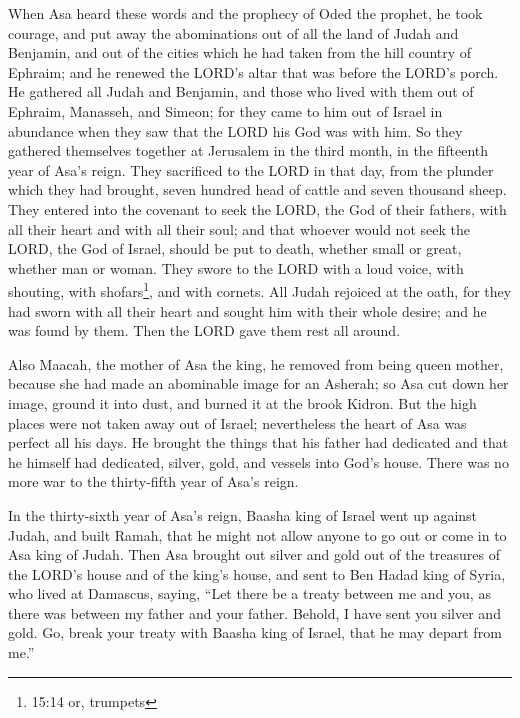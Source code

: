 \myverse{}When Asa heard these words and the prophecy of Oded the prophet,
he took courage, and put away the abominations out of all the land of Judah and Benjamin, and out of the
cities which he had taken from the hill country of Ephraim; and he renewed the LORD’s altar that was before
the LORD’s porch.
\myverse{}He gathered all Judah and Benjamin, and those who lived with them out of Ephraim,
Manasseh, and Simeon; for they came to him out of Israel in abundance when they saw that the LORD his
God was with him.
\myverse{}So they gathered themselves together at Jerusalem in the third month, in
the fifteenth year of Asa’s reign.
\myverse{}They sacrificed to the LORD in that day, from the plunder which they had
brought, seven hundred head of cattle and seven thousand sheep.
\myverse{}They entered into the covenant to seek the LORD, the God of their fathers,
with all their heart and with all their soul;
\myverse{}and that whoever would not seek the LORD, the God of Israel, should be put
to death, whether small or great, whether man or woman.
\myverse{}They swore to the LORD with a loud voice, with shouting, with shofars\footnote{15:14 or, trumpets},
and with cornets.
\myverse{}All Judah rejoiced at the oath, for they had sworn with all their heart and
sought him with their whole desire; and he was found by them. Then the LORD gave them rest all around.

\myverse{}Also Maacah, the mother of Asa the king, he removed from being
queen mother, because she had made an abominable image for an Asherah; so Asa cut down her image, ground
it into dust, and burned it at the brook Kidron.
\myverse{}But the high places were not taken away out of Israel; nevertheless the heart
of Asa was perfect all his days.
\myverse{}He brought the things that his father had dedicated and that he himself had
dedicated, silver, gold, and vessels into God’s house.
\myverse{}There was no more war to the thirty-fifth year of Asa’s reign.


\mychapter{} \myverse*{}In the thirty-sixth year of Asa’s reign, Baasha king of Israel
went up against Judah, and built Ramah, that he might not allow anyone to go out or come in to Asa king
of Judah.
\myverse{}Then Asa brought out silver and gold out of the treasures of the LORD’s house
and of the king’s house, and sent to Ben Hadad king of Syria, who lived at Damascus, saying,
\myverse{}“Let there be a treaty between me and you, as there was between my father and
your father. Behold, I have sent you silver and gold. Go, break your treaty with Baasha king of Israel,
that he may depart from me.”

